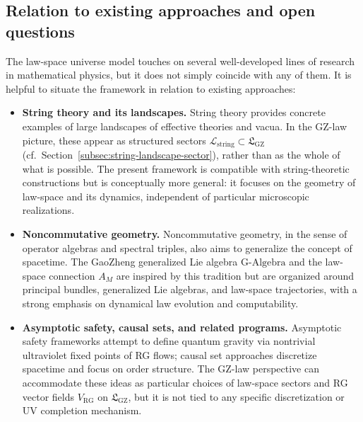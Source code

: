 \documentclass[11pt]{book}
\newcommand{\GAlgebra}{\text{G-Algebra}}
\newcommand{\GZLS}{\ensuremath{\mathfrak{L}_{\mathrm{GZ}}}}
\newcommand{\GZLOC}{\ensuremath{A_M}}
\theoremstyle{plain}
\theoremstyle{definition}
\theoremstyle{remark}
\begin{document}
\subsection{Relation to existing approaches and open questions}
\label{subsec:relation-existing-open}


The law-space universe model touches on several well-developed lines
of research in mathematical physics, but it does not simply coincide
with any of them. It is helpful to situate the framework in relation
to existing approaches:

\begin{itemize}
  \item \textbf{String theory and its landscapes.}
        String theory provides concrete examples of large landscapes
        of effective theories and vacua\cite{Polchinski1998StringTheory,BoussoPolchinski2000}. In the GZ-law picture, these
        appear as structured sectors $\mathcal{L}_{\mathrm{string}}
        \subset \GZLS$ (cf.\ Section~\ref{subsec:string-landscape-sector}),
        rather than as the whole of what is possible. The present
        framework is compatible with string-theoretic constructions
        but is conceptually more general: it focuses on the geometry
        of law-space and its dynamics, independent of particular
        microscopic realizations.
  \item \textbf{Noncommutative geometry.}
        Noncommutative geometry, in the sense of operator algebras
        and spectral triples, also aims to generalize the concept of
        spacetime\cite{Connes1994NCG,ConnesMarcolli2008NCGQG}. The GaoZheng generalized Lie algebra $\GAlgebra$
        and the law-space connection $\GZLOC$ are inspired by this
        tradition but are organized around principal bundles,
        generalized Lie algebras, and law-space trajectories, with a
        strong emphasis on dynamical law evolution and computability.
  \item \textbf{Asymptotic safety, causal sets, and related programs.}
        Asymptotic safety frameworks attempt to define quantum gravity
        via nontrivial ultraviolet fixed points of RG flows\cite{Weinberg1979AS,ReuterSaueressig2012AS}; causal
        set approaches discretize spacetime and focus on order
        structure\cite{Bombelli1987CausalSet,Sorkin2003CausalSet}. The GZ-law perspective can accommodate these
        ideas as particular choices of law-space sectors and RG
        vector fields $V_{\mathrm{RG}}$ on $\GZLS$, but it is not
        tied to any specific discretization or UV completion
        mechanism.
\end{itemize}
\end{document}
